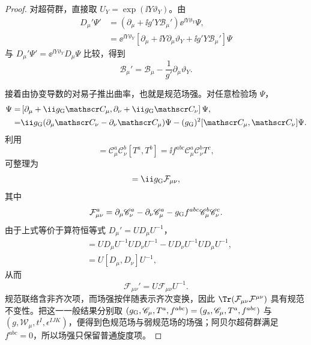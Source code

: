 \begin{proof}
对超荷群，直接取 $U_Y=\exp(\ii Y\vartheta_Y)$。由
\begin{align*}
 D_\mu'\Psi'
 &=\left(\partial_\mu+\ii g'Y\mathcal B_\mu'\right)
   \ee^{\ii Y\vartheta_Y}\Psi,\\
 &=\ee^{\ii Y\vartheta_Y}
 \left[\partial_\mu+\ii Y\partial_\mu\vartheta_Y
 +\ii g'Y\mathcal B_\mu'\right]\Psi
\end{align*}
与 $D_\mu'\Psi'=\ee^{\ii Y\vartheta_Y}D_\mu\Psi$ 比较，得到
\begin{equation*}
 {
 \mathcal B_\mu'=\mathcal B_\mu-\frac1{g'}\partial_\mu\vartheta_Y.}
\end{equation*}

接着由协变导数的对易子推出曲率，也就是规范场强。对任意检验场 $\Psi$，
\begin{align*}
 [D_\mu,D_\nu]\Psi
 =&\left[\partial_\mu+\ii g_{\rm G}\mathscr C_\mu,
 \partial_\nu+\ii g_{\rm G}\mathscr C_\nu\right]\Psi,\\
 =&\ii g_{\rm G}(\partial_\mu \mathscr C_\nu-\partial_\nu \mathscr C_\mu)\Psi
 -(g_{\rm G})^2[\mathscr C_\mu,\mathscr C_\nu]\Psi.
\end{align*}
利用
\begin{equation*}
 [\mathscr C_\mu,\mathscr C_\nu]
 =\mathscr C_\mu^a\mathscr C_\nu^b[T^a,T^b]
 =\ii f^{abc}\mathscr C_\mu^a\mathscr C_\nu^bT^c,
\end{equation*}
可整理为
\begin{equation*}
 [D_\mu,D_\nu]
 =\ii g_{\rm G}\mathcal F_{\mu\nu},
\end{equation*}
其中
\begin{equation*}
 {
 \mathcal F_{\mu\nu}^a
 =\partial_\mu \mathscr C_\nu^a-\partial_\nu \mathscr C_\mu^a
 -g_{\rm G}f^{abc}\mathscr C_\mu^b\mathscr C_\nu^c.}
\end{equation*}
由于上式等价于算符恒等式 $D_\mu'=UD_\mu U^{-1}$，
\begin{align*}
 [D_\mu',D_\nu']
 &=UD_\mu U^{-1}UD_\nu U^{-1}
  -UD_\nu U^{-1}UD_\mu U^{-1},\\
 &=U[D_\mu,D_\nu]U^{-1},
\end{align*}
从而
\begin{equation*}
 {\mathcal F_{\mu\nu}'=U\mathcal F_{\mu\nu}U^{-1}.}
\end{equation*}
规范联络含非齐次项，而场强按伴随表示齐次变换，因此 $\Tr(\mathcal F_{\mu\nu}\mathcal F^{\mu\nu})$ 具有规范不变性。把这一一般结果分别取 $(g_{\rm G},\mathscr C_\mu,T^a,f^{abc})=(g_s,\mathscr C_\mu,T^a,f^{abc})$ 与 $(g,\mathcal W_\mu,t^I,\epsilon^{IJK})$，便得到色规范场与弱规范场的场强；阿贝尔超荷群满足 $f^{abc}=0$，所以场强只保留普通旋度项。
\end{proof}

